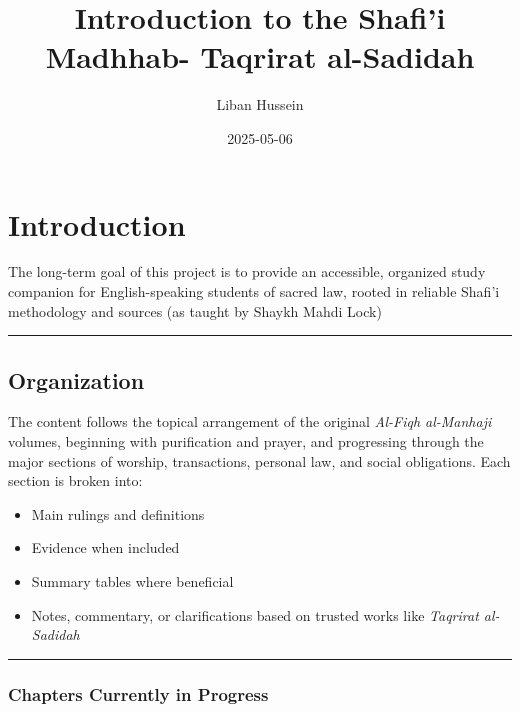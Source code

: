 \documentclass[
  a4paper,
  DIV=11,
  numbers=noendperiod]{scrartcl}
\title{Introduction to the Shafi'i Madhhab- Taqrirat al-Sadidah}
\author{Liban Hussein}
\date{2025-05-06}
\providecommand{\tightlist}{%
  \setlength{\itemsep}{0pt}\setlength{\parskip}{0pt}}
\renewcommand*\contentsname{Table of contents}
\newcommand\contentsname{Table of contents}
\begin{document}
\maketitle

\renewcommand*\contentsname{Table of contents}
{
\hypersetup{linkcolor=}
\setcounter{tocdepth}{3}
\tableofcontents
}

\section{Introduction}\label{sec-intro}

The long-term goal of this project is to provide an accessible,
organized study companion for English-speaking students of sacred law,
rooted in reliable Shafi'i methodology and sources (as taught by Shaykh
Mahdi Lock)

\begin{center}\rule{0.5\linewidth}{0.5pt}\end{center}

\subsection{Organization}\label{organization}

The content follows the topical arrangement of the original
\emph{Al-Fiqh al-Manhaji} volumes, beginning with purification and
prayer, and progressing through the major sections of worship,
transactions, personal law, and social obligations. Each section is
broken into:

\begin{itemize}
\tightlist
\item
  Main rulings and definitions\\
\item
  Evidence when included\\
\item
  Summary tables where beneficial\\
\item
  Notes, commentary, or clarifications based on trusted works like
  \emph{Taqrirat al-Sadidah}
\end{itemize}

\begin{center}\rule{0.5\linewidth}{0.5pt}\end{center}

\subsubsection{Chapters Currently in
Progress}\label{chapters-currently-in-progress}
\end{document}
